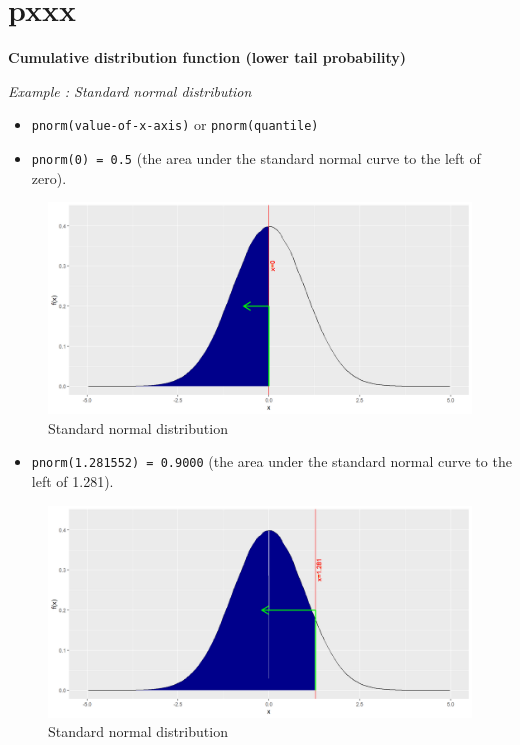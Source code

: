 \documentclass[
]{book}
\providecommand{\tightlist}{%
  \setlength{\itemsep}{0pt}\setlength{\parskip}{0pt}}
\begin{document}
\hypertarget{pxxx}{%
\section{pxxx}\label{pxxx}}

\textbf{Cumulative distribution function (lower tail probability)}

\emph{Example : Standard normal distribution}

\begin{itemize}
\item
  \texttt{pnorm(value-of-x-axis)} or \texttt{pnorm(quantile)}
\item
  \texttt{pnorm(0)\ =\ 0.5} (the area under the standard normal curve to the left of zero).
\end{itemize}

\begin{figure}

{\centering \includegraphics{figure/norm1-1} 

}

\caption{Standard normal distribution}\label{fig:norm1}
\end{figure}

\begin{itemize}
\tightlist
\item
  \texttt{pnorm(1.281552)\ =\ 0.9000} (the area under the standard normal curve to the left of 1.281).
\end{itemize}

\begin{figure}

{\centering \includegraphics{figure/norm2-1} 

}

\caption{Standard normal distribution}\label{fig:norm2}
\end{figure}
\end{document}
